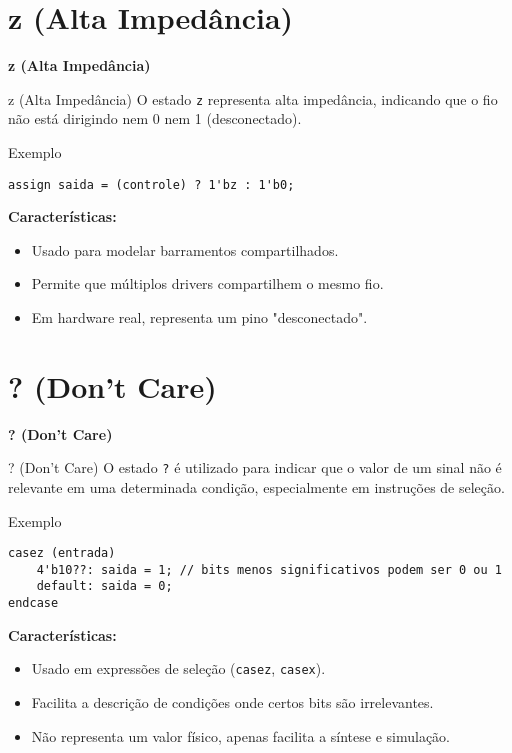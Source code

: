 \documentclass[aspectratio=169,xcolor=dvipsnames]{beamer}
\begin{document}
\section{z (Alta Impedância)}

\begin{frame}
    \Huge{\centerline{\textbf{z (Alta Impedância)}}}
\end{frame}

\begin{frame}[fragile]{z (Alta Impedância)}
O estado \texttt{z} representa alta impedância, indicando que o fio não está dirigindo nem 0 nem 1 (desconectado).

\begin{block}{Exemplo}
\begin{verbatim}
assign saida = (controle) ? 1'bz : 1'b0;
\end{verbatim}
\end{block}

\textbf{Características:}
\begin{itemize}
    \item Usado para modelar barramentos compartilhados.
    \item Permite que múltiplos drivers compartilhem o mesmo fio.
    \item Em hardware real, representa um pino "desconectado".
\end{itemize}
\end{frame}

\section{? (Don't Care)}

\begin{frame}
    \Huge{\centerline{\textbf{? (Don't Care)}}}
\end{frame}

\begin{frame}[fragile]{? (Don't Care)}
O estado \texttt{?} é utilizado para indicar que o valor de um sinal não é relevante em uma determinada condição, especialmente em instruções de seleção.

\begin{block}{Exemplo}
\begin{verbatim}
casez (entrada)
    4'b10??: saida = 1; // bits menos significativos podem ser 0 ou 1
    default: saida = 0;
endcase
\end{verbatim}
\end{block}

\textbf{Características:}
\begin{itemize}
    \item Usado em expressões de seleção (\texttt{casez}, \texttt{casex}).
    \item Facilita a descrição de condições onde certos bits são irrelevantes.
    \item Não representa um valor físico, apenas facilita a síntese e simulação.
\end{itemize}
\end{frame}

\end{document}
